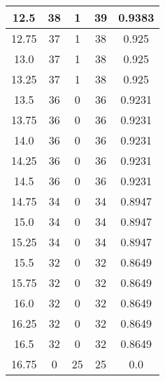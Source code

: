 \documentclass[letterpaper, 12pt]{article}
\begin{document}
\begin{longtable}{|c|c|c|c|c|}
12.5 & 38 & 1 & 39 & 0.9383 \\
\hline
12.75 & 37 & 1 & 38 & 0.925 \\
\hline
13.0 & 37 & 1 & 38 & 0.925 \\
\hline
13.25 & 37 & 1 & 38 & 0.925 \\
\hline
13.5 & 36 & 0 & 36 & 0.9231 \\
\hline
13.75 & 36 & 0 & 36 & 0.9231 \\
\hline
14.0 & 36 & 0 & 36 & 0.9231 \\
\hline
14.25 & 36 & 0 & 36 & 0.9231 \\
\hline
14.5 & 36 & 0 & 36 & 0.9231 \\
\hline
14.75 & 34 & 0 & 34 & 0.8947 \\
\hline
15.0 & 34 & 0 & 34 & 0.8947 \\
\hline
15.25 & 34 & 0 & 34 & 0.8947 \\
\hline
15.5 & 32 & 0 & 32 & 0.8649 \\
\hline
15.75 & 32 & 0 & 32 & 0.8649 \\
\hline
16.0 & 32 & 0 & 32 & 0.8649 \\
\hline
16.25 & 32 & 0 & 32 & 0.8649 \\
\hline
16.5 & 32 & 0 & 32 & 0.8649 \\
\hline
16.75 & 0 & 25 & 25 & 0.0 \\
\hline
\end{longtable}
\end{document}
